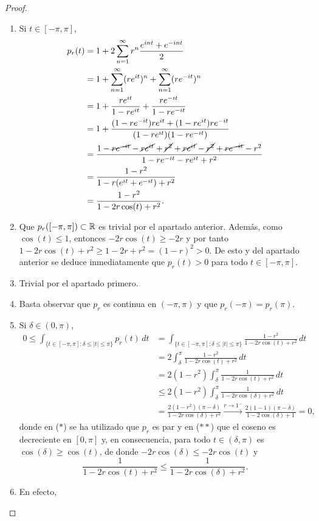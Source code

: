 \documentclass[a4paper, 11pt, oneside]{report}
\begin{document}
\begin{proof}
  \hfill
  \begin{enumerate}
    \item Si $t \in [-\pi,\pi]$,
    \begin{align*}
      p_r(t) &= 1+2\sum_{n=1}^\infty r^n \frac{e^{int}+e^{-int}}{2} \\
      &= 1+\sum_{n=1}^\infty (r e^{it})^n + \sum_{n=1}^\infty (re^{-it})^n \\
      &= 1+\frac{re^{it}}{1-re^{it}} + \frac{re^{-it}}{1-re^{-it}} \\
      &= 1+\frac{(1-re^{-it})re^{it}+(1-re^{it})re^{-it}}{(1-re^{it})(1-re^{-it})} \\
      &= \frac{1-\cancel{re^{-it}}-\cancel{re^{it}}+\cancel{r^2} + \cancel{re^{it}} -\cancel{r^2} + \cancel{re^{-it}} -r^2}{1-re^{-it}-re^{it}+r^2} \\
      &= \frac{1-r^2}{1-r(e^{it}+e^{-it})+r^2} \\
      &= \frac{1-r^2}{1-2r\cos(t)+r^2}.
    \end{align*}
    \item Que $p_r([-\pi,\pi]) \subset \mathbb R$ es trivial por el apartado anterior. Además, como $\cos(t) \leq 1$, entonces $-2r\cos(t)\geq -2r$ y por tanto $1-2r\cos(t)+r^2 \geq 1-2r+r^2 = (1-r)^2 > 0$. De esto y del apartado anterior se deduce inmediatamente que $p_r(t)>0$ para todo $t \in [-\pi,\pi]$.
    \item Trivial por el apartado primero.
    \item Basta observar que $p_r$ es continua en $(-\pi,\pi)$ y que $p_r(-\pi) = p_r(\pi)$.
    \item Si $\delta \in (0,\pi)$,
    \begin{align*}
      0 \leq \int_{\{t \in [-\pi,\pi] \colon \delta \leq |t| \leq \pi\}} p_r(t) \, dt &= \int_{\{t \in [-\pi,\pi] \colon \delta \leq |t| \leq \pi\}} \frac{1-r^2}{1-2r\cos(t)+r^2} \, dt \\
      &= 2\int_\delta^\pi \frac{1-r^2}{1-2r\cos(t)+r^2} \, dt \tag{$\ast$} \\ 
      &= 2(1-r^2)\int_\delta^\pi \frac{1}{1-2r\cos(t)+r^2} \, dt \\
      &\leq 2(1-r^2)\int_\delta^\pi \frac{1}{1-2r\cos(\delta)+r^2} \, dt \tag{$\ast\ast$} \\
      &= \frac{2(1-r^2)(\pi-\delta)}{1-2r\cos(\delta)+r^2} \xrightarrow{r \to 1^-} \frac{2(1-1)(\pi-\delta)}{1-2\cos(\delta)+1} = 0,
    \end{align*}
    donde en ($\ast$) se ha utilizado que $p_r$ es par y en ($\ast\ast$) que el coseno es decreciente en $[0,\pi]$ y, en consecuencia, para todo $t \in(\delta,\pi)$ es $\cos(\delta) \geq \cos(t)$, de donde $-2r\cos(\delta) \leq -2r\cos(t)$ y
    \[\frac{1}{1-2r\cos(t)+r^2} \leq \frac{1}{1-2r\cos(\delta)+r^2}.\]
    \item En efecto,


\end{enumerate}
\end{proof}
\end{document}
